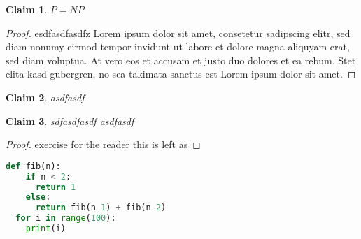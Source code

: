 \documentclass{article}[11pt]
\theoremstyle{plain}%
\newtheorem{protoclaim}{Claim}[section]
\newenvironment{clm}
{\begin{tcolorbox}[colback=green!15!white,colframe=green!35!black]\begin{protoclaim}}
{\end{protoclaim}\end{tcolorbox}}
\begin{document}
\begin{clm}
 $P=NP$
\end{clm}
\begin{proof}
esdfasdfasdfz  
Lorem ipsum dolor sit amet, consetetur sadipscing elitr, sed diam
nonumy eirmod tempor invidunt ut labore et dolore magna aliquyam
erat, sed diam voluptua. At vero eos et accusam et justo duo
dolores et ea rebum. Stet clita kasd gubergren, no sea takimata
sanctus est Lorem ipsum dolor sit amet.
\end{proof}

\begin{clm}
  asdfasdf
\end{clm}

\begin{clm}
 sdfasdfasdf asdfasdf
\end{clm}
\begin{proof}
  exercise for the reader this is left as
\end{proof}

\begin{lstlisting}[language=python]
  def fib(n):
    if n < 2:
      return 1
    else:
      return fib(n-1) + fib(n-2)
  for i in range(100):
    print(i)
\end{lstlisting}
\end{document}
